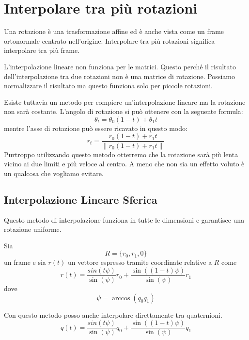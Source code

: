 \section{Interpolare tra pi\`u rotazioni}
Una rotazione \`e una trasformazione affine ed \`e anche vista come un frame ortonormale centrato nell'origine.
Interpolare tra pi\`u rotazioni significa interpolare tra pi\`u frame.

L'interpolazione lineare non funziona per le matrici. Questo perch\'e il risultato dell'interpolazione tra due rotazioni
non \`e una matrice di rotazione. Possiamo normalizzare il risultato ma questo funziona solo per piccole rotazioni.

Esiste tuttavia un metodo per compiere un'interpolazione lineare ma la rotazione non sar\`a costante.
L'angolo di rotazione si pu\`o ottenere con la seguente formula:
\[ \theta_t = \theta_0 (1 - t) + \theta_1 t \]
mentre l'asse di rotazione pu\`o essere ricavato in questo modo:
\[ r_t = \frac{r_0 (1 - t) + r_1 t}{\| r_0 (1 - t) + r_1 t \|} \]
Purtroppo utilizzando questo metodo otterremo che la rotazione sar\`a pi\`u lenta vicino ai due limiti e pi\`u veloce
al centro. A meno che non sia un effetto voluto \`e un qualcosa che vogliamo evitare.

\subsection{Interpolazione Lineare Sferica}
Questo metodo di interpolazione funziona in tutte le dimensioni e garantisce una rotazione uniforme.

Sia
\[ R = \{ r_0, r_1, 0 \} \]
un frame e sia $r(t)$ un vettore espresso tramite coordinate relative a $R$ come
\[ r(t) = \frac{sin{(t \psi)}}{\sin{(\psi)}} r_0 + \frac{\sin{((1 - t) \psi)}}{\sin{(\psi)}} r_1 \]
dove
\[\psi = \arccos{(q_0 q_1)} \]

Con questo metodo posso anche interpolare direttamente tra quaternioni.
\[ q(t) = \frac{sin{(t \psi)}}{\sin{(\psi)}} q_0 + \frac{\sin{((1 - t) \psi)}}{\sin{(\psi)}} q_1 \]
